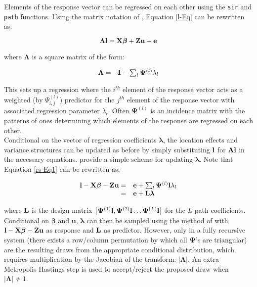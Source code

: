 \documentclass{article}
\begin{document}
Elements of the response vector can be regressed on each other using the \texttt{sir} and \texttt{path} functions. Using the matrix notation of \citet{Gianola.2004}, Equation \ref{l-Eq} can be rewritten as:

\begin{equation}
{\bm \Lambda}{\bf l}  = {\bf X}{\bm \beta}+{\bf Z}{\bf u}+{\bf e}
\label{rs-Eq1}
\end{equation}

where ${\bm \Lambda}$ is a square matrix of the form:

\begin{equation}
\begin{array}{rl}
{\bm \Lambda} =& {\bf I}-\sum_{l}{\bm \Psi}^{(l)}\lambda_{l}\\
\end{array}
\label{rs-Eq2}
\end{equation}

This sets up a regression where the $i^{th}$ element of the response vector acts as a weighted (by $\Psi^{(l)}_{i,j}$) predictor for the $j^{th}$ element of the response vector with associated regression parameter $\lambda_{l}$. Often ${\bm \Psi}^{(l)}$ is an incidence matrix with the patterns of ones determining which elements of the response are regressed on each other.\\

Conditional on the vector of regression coefficients ${\bm \lambda}$, the location effects and variance structures can be updated as before by simply substituting ${\bf l}$ for ${\bm \Lambda}{\bf l}$ in the necessary equations. \citet{Gianola.2004} provide a simple scheme for updating ${\bm \lambda}$. Note that Equation \ref{rs-Eq1} can be rewritten as:

\begin{equation}
\begin{array}{rl}
{\bf l} - {\bf X}{\bm \beta} - {\bf Z}{\bf u} =& {\bf e}+\sum_{l}{\bm \Psi}^{(l)}{\bf l}\lambda_{l}\\
                                              =& {\bf e}+{\bf L}{\bm \lambda}\\
\end{array}
\end{equation}

where ${\bf L}$ is the design matrix $\left[{\bm \Psi}^{(1)}{\bf l}, {\bm \Psi}^{(2)}{\bf l} \dots {\bm \Psi}^{(L)}{\bf l}\right]$ for the $L$ path coefficients. Conditional on ${\bm \beta}$ and ${\bm u}$, ${\bm \lambda}$ can then be sampled using the method of \citet{Garcia-Cortes.2001} with ${\bf l} - {\bf X}{\bm \beta} - {\bf Z}{\bf u}$ as response and ${\bf L}$ as predictor. However, only in a fully recursive system (there exists a row/column permutation by which all ${\bm \Psi}$'s are triangular) are the resulting draws from the appropriate conditional distribution, which requires multiplication by the Jacobian of the transform: $|{\bm \Lambda}|$. An extra Metropolis Hastings step is used to accept/reject the proposed draw when $|{\bm \Lambda}|\neq 1$.\\
\end{document}
